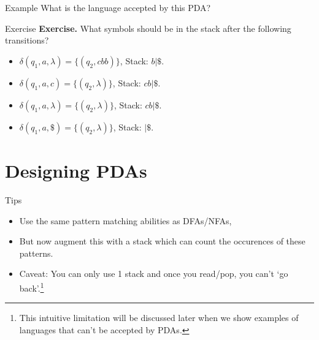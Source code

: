 \documentclass[10pt]{beamer}
\begin{document}
\begin{frame}{Example}
    What is the language accepted by this PDA?
    \begin{center}
    \end{center}
\end{frame}

\begin{frame}{Exercise}
    \textbf{Exercise.} What symbols should be in the stack after the following transitions?
    \begin{itemize}
        \item $\delta (q_1, a, \lambda) =\{(q_2, cbb)\}$, Stack: $b|\$$.
        \item $\delta (q_1, a, c) =\{(q_2, \lambda)\}$, Stack: $cb|\$$.
        \item $\delta (q_1, a, \lambda) =\{(q_2, \lambda)\}$, Stack: $cb|\$$.
        \item $\delta (q_1, a, \$) =\{(q_2, \lambda)\}$, Stack: $|\$$.
    \end{itemize}
\end{frame}

\section{Designing PDAs}

\begin{frame}{Tips}
    \begin{itemize}
        \item Use the same pattern matching abilities as DFAs/NFAs,
        \item But now augment this with a stack which can count the occurences of these patterns.
        \item Caveat: You can only use 1 stack and once you read/pop, you can't `go back'.\footnote{This intuitive limitation will be discussed later when we show examples of languages that can't be accepted by PDAs.}
    \end{itemize}
\end{frame}
\end{document}
